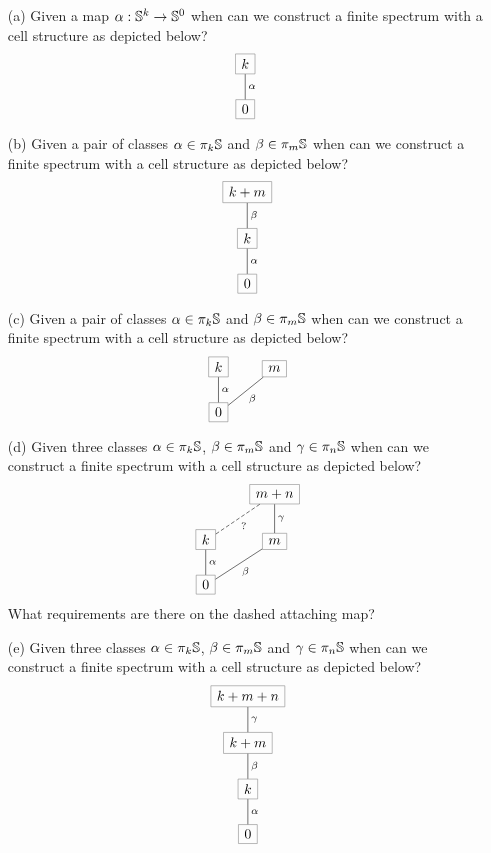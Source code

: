 \documentclass[reqno]{amsart}
\begin{document}
\begin{itemize}
\item[(a)] Given a map $\alpha : \mathbb{S}^k \to \mathbb{S}^0$
  when can we construct a finite spectrum
  with a cell structure as depicted below?
  \[ \begin{tikzcd}[cells={nodes={draw=gray}}]
    {k} \ar[d, "\alpha", no head] \\ {0}
  \end{tikzcd} \]
\item[(b)] Given a pair of classes $\alpha \in \pi_k\mathbb{S}$ and $\beta \in \pi_m\mathbb{S}$
  when can we construct a finite spectrum
  with a cell structure as depicted below?
  \[ \begin{tikzcd}[cells={nodes={draw=gray}}]    
    {k+m} \ar[d, "\beta", no head] \\ {k} \ar[d, "\alpha", no head] \\ {0}
  \end{tikzcd} \]
\item[(c)] Given a pair of classes $\alpha \in \pi_k\mathbb{S}$ and $\beta \in \pi_m\mathbb{S}$
  when can we construct a finite spectrum
  with a cell structure as depicted below?
  \[ \begin{tikzcd}[cells={nodes={draw=gray}}]    
    {k} \ar[d, "\alpha", no head] & {m} \ar[dl, "\beta", no head] \\ {0}
  \end{tikzcd} \]
\item[(d)] Given three classes $\alpha \in \pi_k\mathbb{S}$, $\beta \in \pi_m\mathbb{S}$ and $\gamma \in \pi_{n}\mathbb{S}$ 
  when can we construct a finite spectrum
  with a cell structure as depicted below?
  \[ \begin{tikzcd}[cells={nodes={draw=gray}}]
    & {m+n} \ar[dl, dashed, "?", no head] \ar[d, "\gamma", no head] \\
    {k} \ar[d, "\alpha", no head] & {m} \ar[dl, "\beta", no head] \\ {0}
  \end{tikzcd} \]
  What requirements are there on the dashed attaching map?
\item[(e)] Given three classes $\alpha \in \pi_k\mathbb{S}$, $\beta \in \pi_m\mathbb{S}$ and $\gamma \in \pi_{n}\mathbb{S}$ 
  when can we construct a finite spectrum
  with a cell structure as depicted below?
  \[ \begin{tikzcd}[cells={nodes={draw=gray}}]        
    {k+m+n} \ar[d, "\gamma", no head] \\ {k+m} \ar[d, "\beta", no head] \\ {k} \ar[d, "\alpha", no head] \\ {0}
  \end{tikzcd} \]
\end{itemize}
\end{document}
